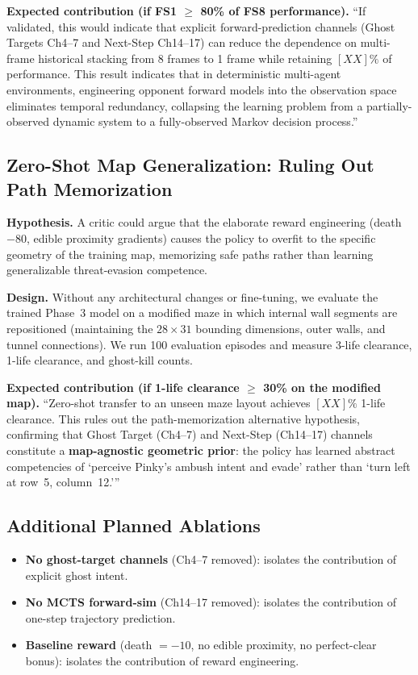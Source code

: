 \documentclass[11pt,a4paper]{article}
\theoremstyle{definition}
\begin{document}
\textbf{Expected contribution (if FS1 $\geq$ 80\% of FS8 performance).}
``If validated, this would indicate that explicit forward-prediction channels (Ghost Targets Ch4--7 and Next-Step Ch14--17) can reduce the dependence on multi-frame historical stacking from 8 frames to 1 frame while retaining $[XX]\%$ of performance.
This result indicates that in deterministic multi-agent environments, engineering opponent forward models into the observation space eliminates temporal redundancy, collapsing the learning problem from a partially-observed dynamic system to a fully-observed Markov decision process.''

\subsection{Zero-Shot Map Generalization: Ruling Out Path Memorization}

\textbf{Hypothesis.}
A critic could argue that the elaborate reward engineering (death $-80$, edible proximity gradients) causes the policy to overfit to the specific geometry of the training map, memorizing safe paths rather than learning generalizable threat-evasion competence.

\textbf{Design.}
Without any architectural changes or fine-tuning, we evaluate the trained Phase~3 model on a modified maze in which internal wall segments are repositioned (maintaining the $28\times31$ bounding dimensions, outer walls, and tunnel connections).
We run 100 evaluation episodes and measure 3-life clearance, 1-life clearance, and ghost-kill counts.

\textbf{Expected contribution (if 1-life clearance $\geq$ 30\% on the modified map).}
``Zero-shot transfer to an unseen maze layout achieves $[XX]\%$ 1-life clearance.
This rules out the path-memorization alternative hypothesis, confirming that Ghost Target (Ch4--7) and Next-Step (Ch14--17) channels constitute a \textbf{map-agnostic geometric prior}: the policy has learned abstract competencies of `perceive Pinky's ambush intent and evade' rather than `turn left at row~5, column~12.'''

\subsection{Additional Planned Ablations}
\begin{itemize}[nosep]
    \item \textbf{No ghost-target channels} (Ch4--7 removed): isolates the contribution of explicit ghost intent.
    \item \textbf{No MCTS forward-sim} (Ch14--17 removed): isolates the contribution of one-step trajectory prediction.
    \item \textbf{Baseline reward} (death $=-10$, no edible proximity, no perfect-clear bonus): isolates the contribution of reward engineering.
\end{itemize}
\end{document}
